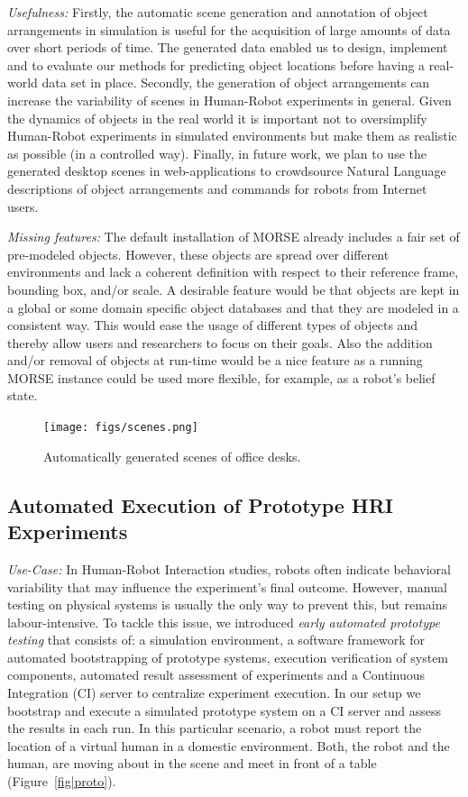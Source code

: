 \documentclass[conference]{IEEEtran}
\begin{document}
\emph{Usefulness:} Firstly, the automatic scene generation and annotation of
object arrangements in simulation is useful for the acquisition of large
amounts of data over short periods of time. The generated data enabled us to
design, implement and to evaluate our methods for predicting object locations
before having a real-world data set in place. Secondly, the generation of
object arrangements can increase the variability of scenes in Human-Robot
experiments in general. Given the dynamics of objects in the real world it is
important not to oversimplify Human-Robot experiments in simulated environments
but make them as realistic as possible (in a controlled way). Finally, in
future work, we plan to use the generated desktop scenes in web-applications to
crowdsource Natural Language descriptions of object arrangements and commands
for robots from Internet users.

\emph{Missing features:} The default installation of MORSE already includes a
fair set of pre-modeled objects. However, these objects are spread over
different environments and lack a coherent definition with respect to their
reference frame, bounding box, and/or scale. A desirable feature would be that
objects are kept in a global or some domain specific object databases and that
they are modeled in a consistent way. This would ease the usage of different
types of objects and thereby allow users and researchers to focus on their
goals. Also the addition and/or removal of objects at run-time would be a nice
feature as a running MORSE instance could be used more flexible, for example,
as a robot's belief state.

\begin{figure}[tb]
  \centering
  \texttt{[image: figs/scenes.png]}
  \caption{Automatically generated scenes of office desks.}
  \label{fig:simulated-desktop-scenes}
\end{figure}


\subsection{Automated Execution of Prototype HRI Experiments}
\label{sc:ci}

\emph{Use-Case:} In Human-Robot Interaction studies, robots often indicate
behavioral variability that may influence the experiment's final outcome.
However, manual testing on physical systems is usually the only way to prevent
this, but remains labour-intensive. To tackle this issue, we introduced
\emph{early automated prototype testing} \cite{2645922} that consists of: a
simulation environment, a software framework for automated bootstrapping of
prototype systems, execution verification of system components, automated result
assessment of experiments \cite{2563606} and a Continuous Integration (CI)
\cite{duvall2007continuous} server to centralize experiment execution. In our
setup we bootstrap and execute a simulated prototype system on a CI server and
assess the results in each run. In this particular scenario, a robot must report
the location of a virtual human in a domestic environment. Both, the robot and
the human, are moving about in the scene and meet in front of a table
(Figure~\ref{fig|proto}).
\end{document}
